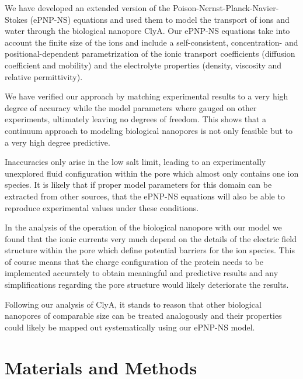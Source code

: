 \documentclass[journal=ancac3,manuscript=article,etalmode=truncate,maxauthors=0,layout=onecolumn]{achemso}
\begin{document}
We have developed an extended version of the Poison-Nernst-Planck-Navier-Stokes (ePNP-NS) equations and used
them to model the transport of ions and water through the biological nanopore ClyA. Our ePNP-NS equations take
into account the finite size of the ions and include a self-consistent, concentration- and
positional-dependent parametrization of the ionic transport coefficients (diffusion coefficient and mobility)
and the electrolyte properties (density, viscosity and relative permittivity).

We have verified our approach by matching experimental results to a very high degree of accuracy while the
model parameters where gauged on other experiments, ultimately leaving no degrees of freedom. This shows that
a continuum approach to modeling biological nanopores is not only feasible but to a very high degree
predictive.

Inaccuracies only arise in the low salt limit, leading to an experimentally unexplored fluid configuration
within the pore which almost only contains one ion species. It is likely that if proper model parameters for
this domain can be extracted from other sources, that the ePNP-NS equations will also be able to reproduce
experimental values under these conditions.

In the analysis of the operation of the biological nanopore with our model we found that the ionic currents
very much depend on the details of the electric field structure within the pore which define potential
barriers for the ion species. This of course means that the charge configuration of the protein needs to be
implemented accurately to obtain meaningful and predictive results and any simplifications regarding the pore
structure would likely deteriorate the results.

Following our analysis of ClyA, it stands to reason that other biological nanopores of comparable size can be
treated analogously and their properties could likely be mapped out systematically using our ePNP-NS model.


\section{Materials and Methods}\label{sec:methods}
\end{document}
